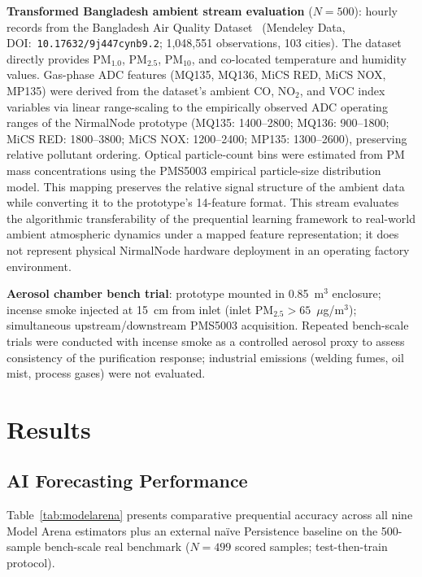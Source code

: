 \documentclass[12pt,a4paper]{article}
\newcommand{\ugsm}{$\mu$g/m$^3$}
\begin{document}
\textbf{Transformed Bangladesh ambient stream evaluation} ($N=500$): hourly records from the
Bangladesh Air Quality Dataset~\citep{paul2026bangladesh} (Mendeley Data,
DOI:~\texttt{10.17632/9j447cynb9.2}; 1,048,551 observations, 103 cities).
The dataset directly provides PM$_{1.0}$, PM$_{2.5}$, PM$_{10}$, and co-located
temperature and humidity values. Gas-phase ADC features (MQ135, MQ136, MiCS RED,
MiCS NOX, MP135) were derived from the dataset's ambient CO, NO$_2$, and VOC index
variables via linear range-scaling to the empirically observed ADC operating ranges
of the NirmalNode prototype (MQ135: 1400--2800; MQ136: 900--1800; MiCS RED: 1800--3800;
MiCS NOX: 1200--2400; MP135: 1300--2600), preserving relative pollutant ordering.
Optical particle-count bins were estimated from PM mass concentrations using the
PMS5003 empirical particle-size distribution model. This mapping preserves the
relative signal structure of the ambient data while converting it to the prototype's
14-feature format. This stream evaluates the algorithmic transferability of the prequential learning framework
to real-world ambient atmospheric dynamics under a mapped feature representation; it does not represent
physical NirmalNode hardware deployment in an operating factory environment.

\textbf{Aerosol chamber bench trial}: prototype mounted in 0.85~m$^3$ enclosure; incense
smoke injected at 15~cm from inlet (inlet PM$_{2.5}>65$~\ugsm); simultaneous
upstream/downstream PMS5003 acquisition. Repeated bench-scale trials were conducted
with incense smoke as a controlled aerosol proxy to assess consistency of the
purification response; industrial emissions (welding fumes, oil mist, process gases)
were not evaluated.


\section{Results}
\label{sec:results}

\subsection{AI Forecasting Performance}

Table~\ref{tab:modelarena} presents comparative prequential accuracy across all nine
Model Arena estimators plus an external na\"ive Persistence baseline on the 500-sample bench-scale real
benchmark ($N=499$ scored samples; test-then-train protocol).
\end{document}

